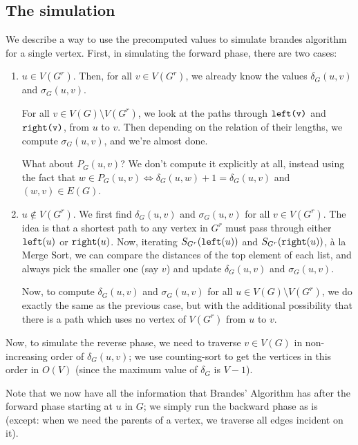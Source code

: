 \subsection{The simulation}
We describe a way to use the precomputed values to simulate brandes
algorithm for a single vertex.
First, in simulating the forward phase, there are two cases:

\begin{enumerate}[I]
	\item
		$u \in V(G^r)$.
		Then, for all $v \in V(G^r)$, we already know the values
		$\delta_G(u, v)$ and $\sigma_G(u, v)$.

		For all $v \in V(G) \setminus V(G^r)$, we look at the paths
		through $\texttt{left(v)}$ and $\texttt{right(v)}$, from $u$ to $v$.
		Then depending on the relation of their lengths, we compute
		$\sigma_G(u, v)$, and we're almost done.
		
		What about $P_G(u, v)$? We don't compute it explicitly at all,
		instead using the fact that
		$w \in P_G(u, v) \iff \delta_G(u, w) + 1 = \delta_G(u, v)$ and
		$(w, v) \in E(G)$.
	\item
		$u \notin V(G^r)$.
		We first find $\delta_G(u, v)$ and $\sigma_G(u, v)$
		for all $v \in V(G^r)$.
		The idea is that a shortest path to any vertex in $G^r$ must
		pass through either $\texttt{left}(u)$ or $\texttt{right}(u)$.
		Now, iterating $S_{G^r}(\texttt{left}(u))$ and $S_{G^r}(\texttt{right}(u))$,
		à la Merge Sort, we can compare the distances of the top element
		of each list, and always pick the smaller one (say $v$) and update
		$\delta_G(u, v)$ and $\sigma_G(u, v)$.

		Now, to compute $\delta_G(u, v)$ and $\sigma_G(u, v)$
		for all $u \in V(G) \setminus V(G^r)$, we do exactly the same as
		the previous case, but with the additional possibility that
		there is a path which uses no vertex of $V(G^r)$ from $u$ to $v$.
\end{enumerate}

Now, to simulate the reverse phase, we need to traverse $v\in V(G)$
in non-increasing order of $\delta_G(u, v)$; we use counting-sort to get
the vertices in this order in $O(V)$
(since the maximum value of $\delta_G$ is $V - 1$).

Note that we now have all the information that Brandes' Algorithm has after
the forward phase starting at $u$ in $G$; we simply run the backward phase
as is (except: when we need the parents of a vertex, we traverse all edges
incident on it).
